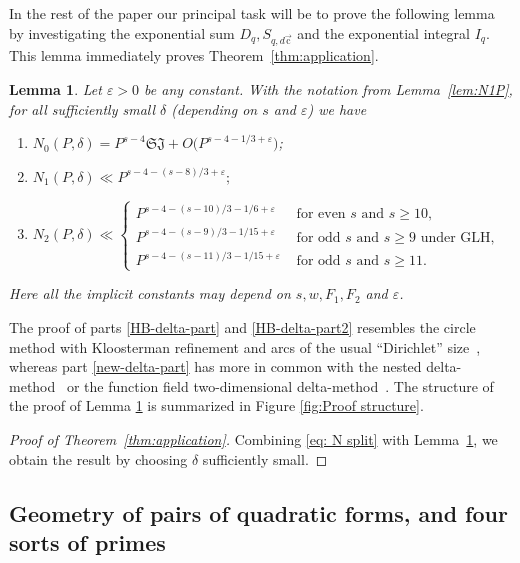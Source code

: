 \documentclass[letterpaper,11pt]{amsart}
\numberwithin{equation}{section}
\newtheorem{lemma}[theorem]{Lemma}
\theoremstyle{definition}
\numberwithin{equation}{section}
\newcommand{\uc}{{\vec{\mathrm{c}}}}
\newcommand{\ve}{\varepsilon}
\begin{document}
In the rest of the paper our principal task will be to 
 prove the following lemma by investigating the exponential sum $D_q, S_{q, d\uc}$ and the exponential integral $I_q$. This lemma immediately proves Theorem~\ref{thm:application}. 
\begin{lemma} \label{lem:Ni-bounds} Let $\varepsilon>0$ be any constant. With the notation from Lemma~\ref{lem:N1P}, for all sufficiently small  \(\delta\) (depending on $s$ and $\varepsilon$)
we have
\begin{enumerate}[$(a)$]
    \item \label{HB-delta-part}
$
N_0(P, \delta)=P^{s-4}\mathfrak S \mathfrak J  +O\Big( P^{s-4-1/3+\ve}\Big)$;
\item \label{HB-delta-part2} $
N_1(P, \delta)\ll P^{s-4-(s-8)/3+\ve};$
    \item \label{new-delta-part}
    $
N_2(P, \delta)\ll \begin{cases} P^{s-4-(s-10)/3-1/6+\ve} &\text{ for even $s$ and $s\geq 10$},\\ P^{s-4-(s-9)/3-1/15+\ve} & \text{ for odd $s$ and $s\geq 9$ under GLH,}\\
 P^{s-4-(s-11)/3-1/15+\ve} & \text{ for odd $s$ and $s\geq 11$.}\end{cases}$
\end{enumerate}
Here all the implicit constants may depend on \(s,w,F_1,F_2\) and \(\ve\).
\end{lemma}




The proof of parts \eqref{HB-delta-part} and \eqref{HB-delta-part2} resembles the circle method with Kloosterman refinement and arcs of the usual ``Dirichlet'' size~\cite{Heath-Brown96,HBP}, whereas part \eqref{new-delta-part} has more in common with the nested delta-method~\cite{BM} or the function field two-dimensional delta-method~\cite[Lemma 5.1, section~6]{V19}. The structure of the proof of Lemma \ref{lem:Ni-bounds} is summarized in Figure \ref{fig:Proof structure}.  

\begin{proof}[Proof of Theorem~\ref{thm:application}]
	Combining \eqref{eq: N split} with Lemma~\ref{lem:Ni-bounds}, we obtain the result by choosing $\delta$ sufficiently small. 
\end{proof}

\subsection{Geometry of pairs of quadratic forms, and four sorts of primes}\label{sec:geometry}
\end{document}
